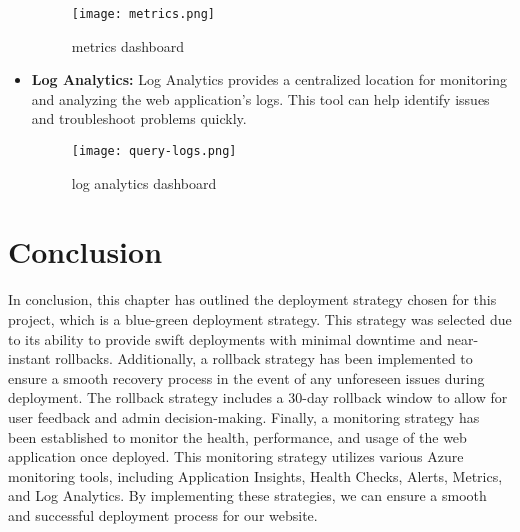 \begin{itemize}
          \begin{figure}[htbp]
              \centering
              \texttt{[image: metrics.png]}
              \caption{metrics dashboard}
              \label{fig:monitoring-metrics}
          \end{figure}

    \item \textbf{Log Analytics:} Log Analytics provides a centralized location for monitoring and analyzing the web application's logs. This tool can help identify issues and troubleshoot problems quickly.

          \begin{figure}[htbp]
              \centering
              \texttt{[image: query-logs.png]}
              \caption{log analytics dashboard}
              \label{fig:monitoring-log-analytics}
          \end{figure}

\end{itemize}
\pagebreak
\section*{Conclusion}
In conclusion, this chapter has outlined the deployment strategy chosen for this project, which is a blue-green deployment strategy. This strategy was selected due to its ability to provide swift deployments with minimal downtime and near-instant rollbacks. Additionally, a rollback strategy has been implemented to ensure a smooth recovery process in the event of any unforeseen issues during deployment. The rollback strategy includes a 30-day rollback window to allow for user feedback and admin decision-making. Finally, a monitoring strategy has been established to monitor the health, performance, and usage of the web application once deployed. This monitoring strategy utilizes various Azure monitoring tools, including Application Insights, Health Checks, Alerts, Metrics, and Log Analytics. By implementing these strategies, we can ensure a smooth and successful deployment process for our website.
